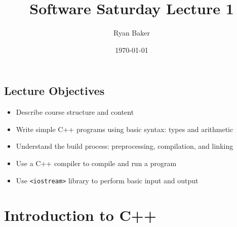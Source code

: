 \documentclass{article}
\title{Software Saturday Lecture 1}
\author{Ryan Baker}
\date{\today}
\begin{document}
\maketitle
\tableofcontents
\pagebreak

\subsection*{Lecture Objectives}

\begin{itemize}
	\item Describe course structure and content
	\item Write simple C++ programs using basic syntax: types and arithmetic
	\item Understand the build process: preprocessing, compilation, and linking
	\item Use a C++ compiler to compile and run a program
	\item Use \texttt{<iostream>} library to perform basic input and output
\end{itemize}

\section{Introduction to C++}
\end{document}
